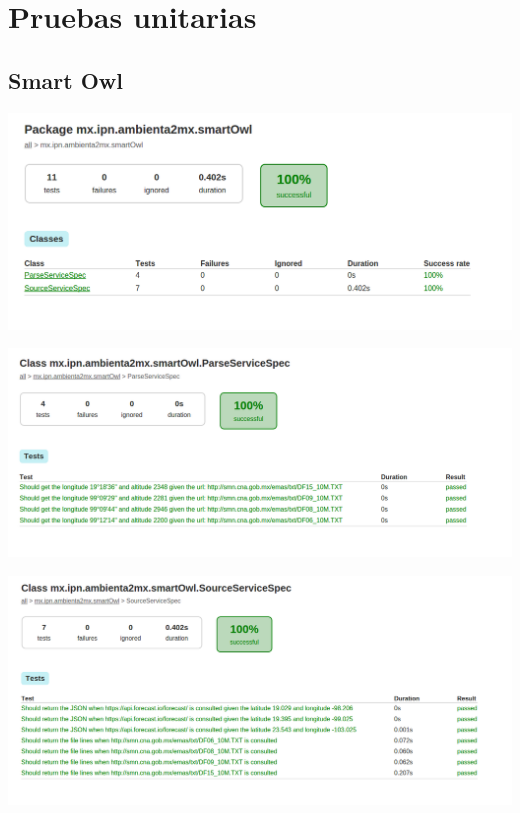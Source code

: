 \newpage
\section*{Pruebas unitarias}
\subsection*{Smart Owl}
\begin{center}
  \includegraphics[width=\textwidth]{images/SmartOwlTest1}
\end{center}

\begin{center}
  \includegraphics[width=\textwidth]{images/SmartOwlTest2}
\end{center}

\begin{center}
  \includegraphics[width=\textwidth]{images/SmartOwlTest3}
\end{center}
